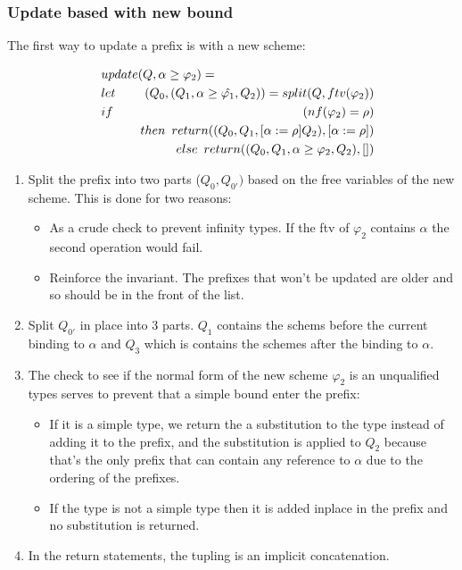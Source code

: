 \subsubsection{Update based with new bound}
The first way to update a prefix is with a new scheme:

\begin{eqnarray*}
\lefteqn{update(Q, \alpha \geq \varphi_2) =} \\
\hspace{10pt} &let & (Q_0, (Q_1, \alpha \geq \hat{\varphi_1}, Q_2)) = split(Q, ftv(\varphi_2)) \\
              &if & (nf(\varphi_2)= \rho) \\
              &\hspace{5pt}& \hspace{10pt} then \hspace{5pt} return ((Q_0, Q_1, \lbrack \alpha := \rho \rbrack Q_2), \lbrack \alpha := \rho \rbrack) \\
              &\hspace{5pt}& \hspace{10pt} else \hspace{5pt} return ((Q_0, Q_1, \alpha \geq \varphi_2, Q_2), \lbrack \rbrack)
\end{eqnarray*}

\begin{enumerate}
\item{ Split the prefix into two parts ($Q_0, Q_{0'})$ based on the free variables of the new scheme. This is done for two reasons:  
		\begin{itemize}
		\item As a crude check to prevent infinity types. If the ftv of $\varphi_2$ contains $\alpha$ the second operation would fail.
		\item Reinforce the invariant. The prefixes that won't be updated are older and so should be in the front of the list.
		\end{itemize}
     }
\item Split $Q_{0'}$ in place into 3 parts. $Q_1$ contains the schems before the current binding to $\alpha$ and $Q_3$ which is contains the schemes after the binding to $\alpha$.
\item{ The check to see if the normal form of the new scheme $\varphi_2$ is an unqualified types serves to prevent that a simple bound enter the prefix:
		\begin{itemize}
		\item If it is a simple type, we return the a substitution to the type instead of adding it to the prefix, and the substitution is applied to $Q_2$ because that's the only prefix that can contain any reference to $\alpha$ due to the ordering of the prefixes.
		\item If the type is not a simple type then it is added inplace in the prefix and no substitution is returned.
		\end{itemize}
     }
\item In the return statements, the tupling is an implicit concatenation. 
\end{enumerate}

